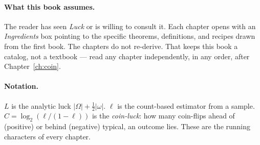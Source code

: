 \paragraph{What this book assumes.}  The reader has seen \textit{Luck} or
is willing to consult it.  Each chapter opens with an
\textit{Ingredients} box pointing to the specific theorems, definitions,
and recipes drawn from the first book.  The chapters do not re-derive.
That keeps this book a catalog, not a textbook --- read any chapter
independently, in any order, after Chapter~\ref{ch:coin}.

\paragraph{Notation.}  $L$ is the analytic luck $|\Omega| + \tfrac{1}{2}
|\omega|$.  $\ell$ is the count-based estimator from a sample.  $C =
\log_2(\ell/(1-\ell))$ is the \emph{coin-luck}: how many coin-flips ahead
of (positive) or behind (negative) typical, an outcome lies.  These are
the running characters of every chapter.
